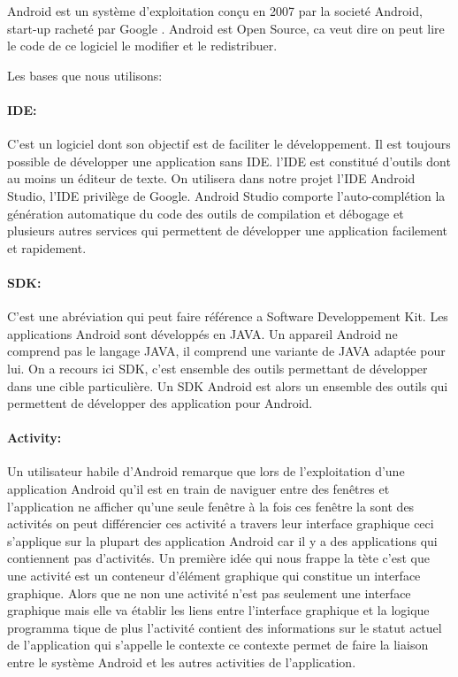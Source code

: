 Android est un système d'exploitation conçu en 2007 par la societé Android,
start-up racheté par Google . Android est Open Source, ca veut dire on peut lire
le code de ce logiciel le modifier et le redistribuer.

Les bases que nous utilisons:

\paragraph{IDE:}

C'est un logiciel dont son objectif est de faciliter le développement. Il est
toujours possible de développer une application sans IDE.
l'IDE est constitué d'outils dont au moins un éditeur de texte.
On utilisera dans notre projet l'IDE Android Studio, l'IDE privilège de Google.
Android Studio comporte l'auto-complétion la génération automatique  du code des
outils de compilation et débogage et plusieurs autres services qui permettent de
développer une application facilement et rapidement.

\paragraph{SDK:}

C’est une abréviation qui peut faire référence a Software Developpement Kit.
Les applications Android sont développés en JAVA. Un appareil Android ne
comprend pas le langage JAVA, il comprend une variante de JAVA adaptée pour lui.
On a recours ici SDK, c'est ensemble des outils permettant de développer dans
une cible particulière. Un SDK Android est alors un ensemble des outils qui
permettent de développer des application pour Android.

\paragraph{Activity:}

Un utilisateur habile d'Android remarque que lors de l'exploitation d'une
application Android qu'il est en train de naviguer entre des fenêtres et
l'application ne afficher qu'une seule fenêtre à la fois ces fenêtre la sont
des activités on peut différencier ces activité a travers leur interface
graphique ceci s'applique sur la plupart des application Android car il y a
des applications qui contiennent pas d'activités. Un première idée qui nous
frappe la tète c'est que une activité est un conteneur d'élément graphique qui
constitue un interface graphique. Alors que ne non une activité n'est pas
seulement une interface graphique mais elle va établir les liens entre
l'interface graphique et la logique programma tique de plus l'activité
contient des informations sur le statut actuel de l'application qui s'appelle le
contexte ce contexte permet de faire la liaison entre le système Android et les
autres activities de l'application.

